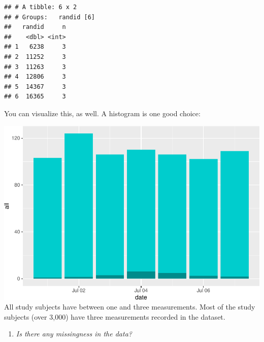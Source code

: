 \documentclass[
]{book}
\newenvironment{Shaded}{\begin{snugshade}}{\end{snugshade}}
\newcommand{\CommentTok}[1]{\textcolor[rgb]{0.56,0.35,0.01}{\textit{#1}}}
\newcommand{\DataTypeTok}[1]{\textcolor[rgb]{0.13,0.29,0.53}{#1}}
\newcommand{\KeywordTok}[1]{\textcolor[rgb]{0.13,0.29,0.53}{\textbf{#1}}}
\newcommand{\NormalTok}[1]{#1}
\newcommand{\OperatorTok}[1]{\textcolor[rgb]{0.81,0.36,0.00}{\textbf{#1}}}
\newcommand{\StringTok}[1]{\textcolor[rgb]{0.31,0.60,0.02}{#1}}
\providecommand{\tightlist}{%
  \setlength{\itemsep}{0pt}\setlength{\parskip}{0pt}}
\begin{document}
\begin{verbatim}
## # A tibble: 6 x 2
## # Groups:   randid [6]
##   randid     n
##    <dbl> <int>
## 1   6238     3
## 2  11252     3
## 3  11263     3
## 4  12806     3
## 5  14367     3
## 6  16365     3
\end{verbatim}

You can visualize this, as well. A histogram is one good choice:

\begin{Shaded}
\end{Shaded}

\includegraphics{adv_epi_analysis_files/figure-latex/unnamed-chunk-151-1.pdf}
All study subjects have between one and three measurements. Most of the study
subjects (over 3,000) have three measurements recorded in the dataset.

\begin{enumerate}
\def\labelenumi{\arabic{enumi}.}
\setcounter{enumi}{1}
\tightlist
\item
  \emph{Is there any missingness in the data?}
\end{enumerate}
\end{document}
